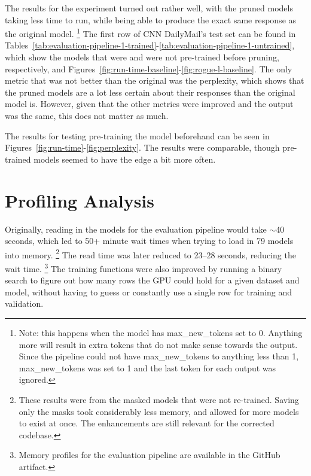\documentclass[
	title={Lottery Ticket Hypothesis for Large Language Models}
]{cs595project}
\begin{document}
The results for the experiment turned out rather well, with the pruned models taking less time to run, while being able to produce the exact same response as the original model.%
\footnote{Note: this happens when the model has max\_new\_tokens set to 0. Anything more will result in extra tokens that do not make sense towards the output. Since the pipeline could not have max\_new\_tokens to anything less than 1, max\_new\_tokens was set to 1 and the last token for each output was ignored.}
The first row of CNN DailyMail's test set can be found in Tables~\ref{tab:evaluation-pipeline-1-trained}-\ref{tab:evaluation-pipeline-1-untrained}, which show the models that were and were not pre-trained before pruning, respectively, and Figures~\ref{fig:run-time-baseline}-\ref{fig:rogue-l-baseline}.
The only metric that was not better than the original was the perplexity, which shows that the pruned models are a lot less certain about their responses than the original model is.
However, given that the other metrics were improved and the output was the same, this does not matter as much.

The results for testing pre-training the model beforehand can be seen in Figures~\ref{fig:run-time}-\ref{fig:perplexity}.
The results were comparable, though pre-trained models seemed to have the edge a bit more often. %

\section{Profiling Analysis}\label{sec:profiling-analysis}
Originally, reading in the models for the evaluation pipeline would take $\sim$40 seconds, which led to 50+ minute wait times when trying to load in 79 models into memory.%
\footnote{These results were from the masked models that were not re-trained. Saving only the masks took considerably less memory, and allowed for more models to exist at once. The enhancements are still relevant for the corrected codebase.}
The read time was later reduced to 23--28 seconds, reducing the wait time.%
\footnote{Memory profiles for the evaluation pipeline are available in the GitHub artifact.}
The training functions were also improved by running a binary search to figure out how many rows the GPU could hold for a given dataset and model, without having to guess or constantly use a single row for training and validation.
\end{document}
